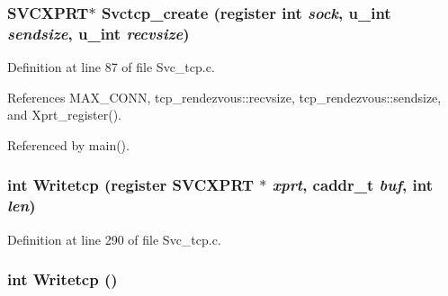 \subsubsection{\setlength{\rightskip}{0pt plus 5cm}SVCXPRT$\ast$ Svctcp\_\-create (register int {\em sock}, u\_\-int {\em sendsize}, u\_\-int {\em recvsize})}\label{Svc__tcp_8c_a14}




Definition at line 87 of file Svc\_\-tcp.c.

References MAX\_\-CONN, tcp\_\-rendezvous::recvsize, tcp\_\-rendezvous::sendsize, and Xprt\_\-register().

Referenced by main().
\subsubsection{\setlength{\rightskip}{0pt plus 5cm}int Writetcp (register SVCXPRT $\ast$ {\em xprt}, caddr\_\-t {\em buf}, int {\em len})}\label{Svc__tcp_8c_a20}




Definition at line 290 of file Svc\_\-tcp.c.
\subsubsection{\setlength{\rightskip}{0pt plus 5cm}int Writetcp ()}\label{Svc__tcp_8c_a12}


